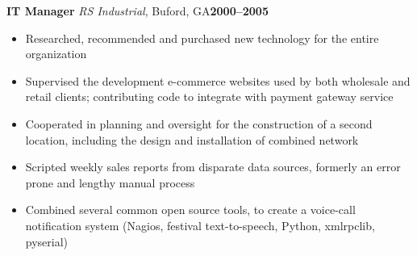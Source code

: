 \documentclass[10pt,letterpaper]{article}
\newcommand{\cventry}[5]{%
{\bfseries{#2}} {\small{\textit{#3}, #4}}\hfill {\small\bfseries{#1}}
\begin{small}\begin{adjustwidth}{1em}{2em}{\raggedright{#5}}\end{adjustwidth}\end{small}
}
\begin{document}
\cventry{2000--2005}{IT Manager}{RS Industrial}{Buford, GA}{%
\begin{itemize}
\item Researched, recommended and purchased new technology for the entire
      organization
\item Supervised the development e-commerce websites used by both wholesale and
      retail clients; contributing code to integrate with payment gateway
      service
\item Cooperated in planning and oversight for the construction of a
      second location, including the design and installation of combined network
\item Scripted weekly sales reports from disparate data
      sources, formerly an error prone and lengthy manual process
\item Combined several common open source tools, to create a voice-call
      notification system (Nagios, festival text-to-speech, Python, xmlrpclib,
      pyserial)
\end{itemize}
}
\end{document}
